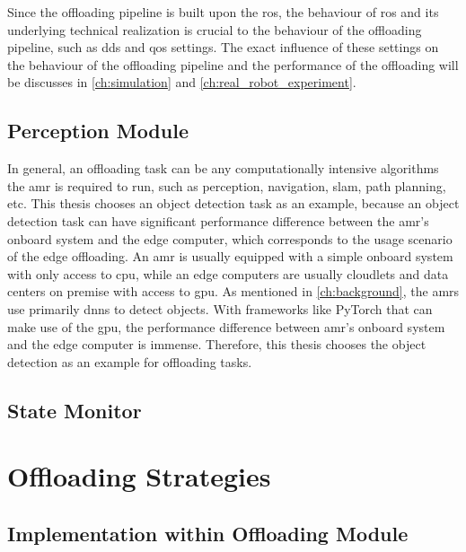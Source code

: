 Since the offloading pipeline is built upon the \gls{ros}, the behaviour of \gls{ros} and its underlying technical realization is crucial to the behaviour of the offloading pipeline, such as \gls{dds} and \gls{qos} settings. The exact influence of these settings on the behaviour of the offloading pipeline and the performance of the offloading will be discusses in \cref{ch:simulation} and \cref{ch:real_robot_experiment}. 

\subsection{Perception Module}


In general, an offloading task can be any computationally intensive algorithms the \gls{amr} is required to run, such as perception, navigation, \gls{slam}, path planning, etc. This thesis chooses an object detection task as an example, because an object detection task can have significant performance difference between the \gls{amr}'s onboard system and the edge computer, which corresponds to the usage scenario of the edge offloading. An \gls{amr} is usually equipped with a simple onboard system with only access to \gls{cpu}, while an edge computers are usually cloudlets and data centers on premise with access to \gls{gpu}. As mentioned in \cref{ch:background}, the \glspl{amr} use primarily \glspl{dnn} to detect objects. With frameworks like PyTorch that can make use of the \gls{gpu}, the performance difference between \gls{amr}'s onboard system and the edge computer is immense. Therefore, this thesis chooses the object detection as an example for offloading tasks. 

\subsection{State Monitor}

\section{Offloading Strategies}\label{sec:general_setup:offloading_strategies}

\subsection{Implementation within Offloading Module}

